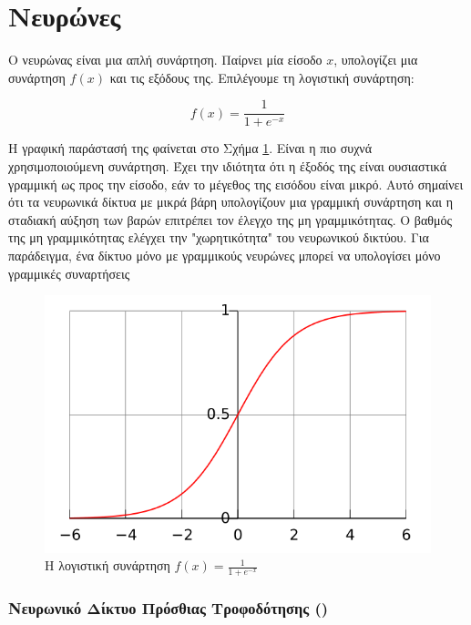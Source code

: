 \section{Νευρώνες}
Ο νευρώνας είναι μια απλή συνάρτηση. Παίρνει μία είσοδο $x$,  υπολογίζει μια συνάρτηση $f(x)$ και τις εξόδους της.  Επιλέγουμε τη λογιστική συνάρτηση:

\[ f(x)=\frac{1}{1+e^{-x}}\]

Η γραφική παράστασή της φαίνεται στο Σχήμα \ref{fig:logistic function}. Είναι η πιο συχνά χρησιμοποιούμενη συνάρτηση. Έχει την ιδιότητα ότι η έξοδός της είναι ουσιαστικά γραμμική ως προς την είσοδο, εάν το μέγεθος της εισόδου είναι μικρό. Αυτό σημαίνει ότι τα νευρωνικά δίκτυα με μικρά βάρη υπολογίζουν μια γραμμική συνάρτηση και η σταδιακή αύξηση των βαρών επιτρέπει τον έλεγχο της μη γραμμικότητας. Ο βαθμός της μη γραμμικότητας ελέγχει την "χωρητικότητα" του νευρωνικού δικτύου. Για παράδειγμα, ένα δίκτυο μόνο με γραμμικούς νευρώνες μπορεί να υπολογίσει μόνο γραμμικές συναρτήσεις

\begin{figure}[h]
\centering
\includegraphics[scale=0.3]{images/Ch2/logistic-function.png}
\caption{Η λογιστική συνάρτηση $f(x)=\frac{1}{1+e^{-x}}$}
\label{fig:logistic function}
\end{figure}

\subsubsection{Νευρωνικό Δίκτυο Πρόσθιας Τροφοδότησης ()}

